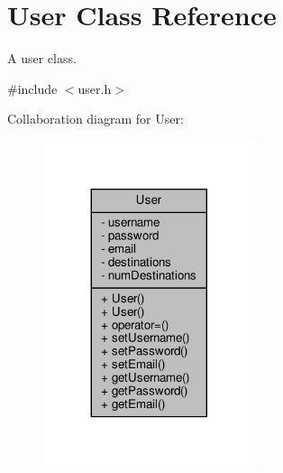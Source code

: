 \hypertarget{class_user}{}\section{User Class Reference}
\label{class_user}


A user class.  




{\ttfamily \#include $<$user.\+h$>$}



Collaboration diagram for User\+:\nopagebreak
\begin{figure}[H]
\begin{center}
\leavevmode
\includegraphics[width=176pt]{class_user__coll__graph}
\end{center}
\end{figure}
